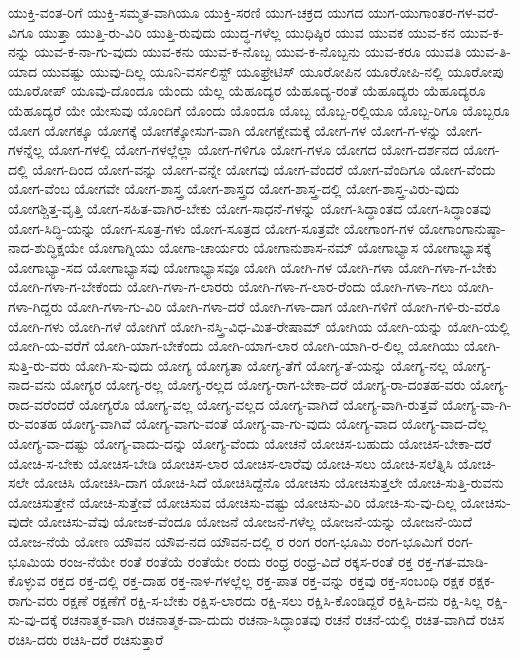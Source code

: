 {ಯುಕ್ತಿ-ವಂತ-ರಿಗೆ
ಯುಕ್ತಿ-ಸಮ್ಮತ-ವಾಗಿಯೂ
ಯುಕ್ತಿ-ಸರಣಿ
ಯುಗ-ಚಕ್ರದ
ಯುಗದ
ಯುಗ-ಯುಗಾಂತರ-ಗಳ-ವರೆ-ವಿಗೂ
ಯುತ್ತಾ
ಯುತ್ತಿ-ರು-ವಿರಿ
ಯುತ್ತಿ-ರುವುದು
ಯುದ್ಧ-ಗಳೆಲ್ಲ
ಯುಧಿಷ್ಠಿರ
ಯುವ
ಯುವಕ
ಯುವ-ಕನ
ಯುವ-ಕ-ನನ್ನು
ಯುವ-ಕ-ನಾ-ಗು-ವುದು
ಯುವ-ಕನು
ಯುವ-ಕ-ನೊಬ್ಬ
ಯುವ-ಕ-ನೊಬ್ಬನು
ಯುವ-ಕರೂ
ಯುವತಿ
ಯುವ-ತಿ-ಯಾದ
ಯುವಷ್ಟು
ಯುವು-ದಿಲ್ಲ
ಯೂನಿ-ವರ್ಸಲಿಸ್ಟ್
ಯೂಫ್ರೇಟಿಸ್
ಯೂರೋಪಿನ
ಯೂರೋಪಿ-ನಲ್ಲಿ
ಯೂರೋಪು
ಯೂರೋಪ್
ಯೂವು-ದೊಂದೂ
ಯೆಂದು
ಯೆಲ್ಲ
ಯೆಹೂದ್ಯರ
ಯೆಹೂದ್ಯ-ರಂತೆ
ಯೆಹೂದ್ಯರು
ಯೆಹೂದ್ಯರೂ
ಯೆಹೂದ್ಯರೆ
ಯೇ
ಯೇಸುವು
ಯೊಂದಿಗೆ
ಯೊಂದು
ಯೊಂದೂ
ಯೊಬ್ಬ
ಯೊಬ್ಬ-ರಲ್ಲಿಯೂ
ಯೊಬ್ಬ-ರಿಗೂ
ಯೊಬ್ಬರೂ
ಯೋಗ
ಯೋಗಕ್ಕೂ
ಯೋಗಕ್ಕೆ
ಯೋಗಕ್ಕೋಸುಗ-ವಾಗಿ
ಯೋಗಕ್ಷೇಮಕ್ಕೆ
ಯೋಗ-ಗಳ
ಯೋಗ-ಗ-ಳನ್ನು
ಯೋಗ-ಗಳನ್ನೆಲ್ಲ
ಯೋಗ-ಗಳಲ್ಲಿ
ಯೋಗ-ಗಳಲ್ಲೆಲ್ಲಾ
ಯೋಗ-ಗಳಿಗೂ
ಯೋಗ-ಗಳೂ
ಯೋಗದ
ಯೋಗ-ದರ್ಶನದ
ಯೋಗ-ದಲ್ಲಿ
ಯೋಗ-ದಿಂದ
ಯೋಗ-ವನ್ನು
ಯೋಗ-ವನ್ನೇ
ಯೋಗವು
ಯೋಗ-ವೆಂದರೆ
ಯೋಗ-ವೆಂದಿಗೂ
ಯೋಗ-ವೆಂದು
ಯೋಗ-ವೆಂಬ
ಯೋಗವೇ
ಯೋಗ-ಶಾಸ್ತ್ರ
ಯೋಗ-ಶಾಸ್ತ್ರದ
ಯೋಗ-ಶಾಸ್ತ್ರ-ದಲ್ಲಿ
ಯೋಗ-ಶಾಸ್ತ್ರ-ವಿರು-ವುದು
ಯೋಗಶ್ಚಿತ್ತ-ವೃತ್ತಿ
ಯೋಗ-ಸಹಿತ-ವಾಗಿರ-ಬೇಕು
ಯೋಗ-ಸಾಧನೆ-ಗಳನ್ನು
ಯೋಗ-ಸಿದ್ಧಾಂತದ
ಯೋಗ-ಸಿದ್ಧಾಂತವು
ಯೋಗ-ಸಿದ್ಧಿ-ಯನ್ನು
ಯೋಗ-ಸೂತ್ರ-ಗಳು
ಯೋಗ-ಸೂತ್ರದ
ಯೋಗ-ಸೂತ್ರವೇ
ಯೋಗಾಂಗ-ಗಳ
ಯೋಗಾಂಗಾನುಷ್ಠಾ-ನಾದ-ಶುದ್ಧಿಕ್ಷಯೇ
ಯೋಗಾಗ್ನಿಯು
ಯೋಗಾ-ಚಾರ್ಯರು
ಯೋಗಾನುಶಾಸ-ನಮ್
ಯೋಗಾಭ್ಯಾಸ
ಯೋಗಾಭ್ಯಾಸಕ್ಕೆ
ಯೋಗಾಭ್ಯಾ-ಸದ
ಯೋಗಾಭ್ಯಾಸವು
ಯೋಗಾಭ್ಯಾಸವೂ
ಯೋಗಿ
ಯೋಗಿ-ಗಳ
ಯೋಗಿ-ಗಳಾ
ಯೋಗಿ-ಗಳಾ-ಗ-ಬೇಕು
ಯೋಗಿ-ಗಳಾ-ಗ-ಬೇಕೆಂದು
ಯೋಗಿ-ಗಳಾ-ಗ-ಲಾರರು
ಯೋಗಿ-ಗಳಾ-ಗ-ಲಾರ-ರೆಂದು
ಯೋಗಿ-ಗಳಾ-ಗಲು
ಯೋಗಿ-ಗಳಾ-ಗಿದ್ದರು
ಯೋಗಿ-ಗಳಾ-ಗು-ವಿರಿ
ಯೋಗಿ-ಗಳಾ-ದರೆ
ಯೋಗಿ-ಗಳಾ-ದಾಗ
ಯೋಗಿ-ಗಳಿಗೆ
ಯೋಗಿ-ಗಳಿ-ರು-ವರೊ
ಯೋಗಿ-ಗಳು
ಯೋಗಿ-ಗಳೆ
ಯೋಗಿಗೆ
ಯೋಗಿ-ನಸ್ತ್ರಿ-ವಿಧ-ಮಿತ-ರೇಷಾಮ್
ಯೋಗಿಯ
ಯೋಗಿ-ಯನ್ನು
ಯೋಗಿ-ಯಲ್ಲಿ
ಯೋಗಿ-ಯ-ವರೆಗೆ
ಯೋಗಿ-ಯಾಗ-ಬೇಕೆಂದು
ಯೋಗಿ-ಯಾಗ-ಲಾರ
ಯೋಗಿ-ಯಾಗಿ-ರ-ಲಿಲ್ಲ
ಯೋಗಿಯು
ಯೋಗಿ-ಸುತ್ತಿ-ರು-ವರು
ಯೋಗಿ-ಸು-ವುದು
ಯೋಗ್ಯ
ಯೋಗ್ಯತಾ
ಯೋಗ್ಯ-ತೆಗೆ
ಯೋಗ್ಯ-ತೆ-ಯನ್ನು
ಯೋಗ್ಯ-ನಲ್ಲ
ಯೋಗ್ಯ-ನಾದ-ವನು
ಯೋಗ್ಯರ
ಯೋಗ್ಯ-ರಲ್ಲ
ಯೋಗ್ಯ-ರಲ್ಲದ
ಯೋಗ್ಯ-ರಾಗ-ಬೇಕಾ-ದರೆ
ಯೋಗ್ಯ-ರಾ-ದಂತಹ-ವರು
ಯೋಗ್ಯ-ರಾದ-ವರೆಂದರೆ
ಯೋಗ್ಯರೊ
ಯೋಗ್ಯ-ವಲ್ಲ
ಯೋಗ್ಯ-ವಲ್ಲದ
ಯೋಗ್ಯ-ವಾಗಿದೆ
ಯೋಗ್ಯ-ವಾಗಿ-ರುತ್ತವೆ
ಯೋಗ್ಯ-ವಾ-ಗಿ-ರು-ವಂತಹ
ಯೋಗ್ಯ-ವಾಗಿವೆ
ಯೋಗ್ಯ-ವಾಗು-ವಂತೆ
ಯೋಗ್ಯ-ವಾ-ಗು-ವುದು
ಯೋಗ್ಯ-ವಾದ
ಯೋಗ್ಯ-ವಾದ-ದೆಲ್ಲ
ಯೋಗ್ಯ-ವಾ-ದಷ್ಟು
ಯೋಗ್ಯ-ವಾದು-ದನ್ನು
ಯೋಗ್ಯ-ವೆಂದು
ಯೋಚನೆ
ಯೋಚಿಸ-ಬಹುದು
ಯೋಚಿಸ-ಬೇಕಾ-ದರೆ
ಯೋಚಿ-ಸ-ಬೇಕು
ಯೋಚಿಸ-ಬೇಡಿ
ಯೋಚಿಸ-ಲಾರ
ಯೋಚಿಸ-ಲಾರೆವು
ಯೋಚಿ-ಸಲು
ಯೋಚಿ-ಸಲೆತ್ನಿಸಿ
ಯೋಚಿ-ಸಲೇ
ಯೋಚಿಸಿ
ಯೋಚಿಸಿ-ದಾಗ
ಯೋಚಿ-ಸಿದೆ
ಯೋಚಿಸಿದ್ದೆನೊ
ಯೋಚಿಸು
ಯೋಚಿಸುತ್ತಲೇ
ಯೋಚಿ-ಸುತ್ತಿ-ರುವನು
ಯೋಚಿಸುತ್ತೇನೆ
ಯೋಚಿ-ಸುತ್ತೇವೆ
ಯೋಚಿಸುವ
ಯೋಚಿಸು-ವಷ್ಟು
ಯೋಚಿಸು-ವಿರಿ
ಯೋಚಿ-ಸು-ವು-ದಿಲ್ಲ
ಯೋಚಿಸು-ವುದೇ
ಯೋಚಿಸು-ವೆವು
ಯೋಜಕ-ವೆಂದೂ
ಯೋಜನೆ
ಯೋಜನೆ-ಗಳೆಲ್ಲ
ಯೋಜನೆ-ಯನ್ನು
ಯೋಜನೆ-ಯಿದೆ
ಯೋಜ-ನೆಯೆ
ಯೋಣ
ಯೌವನ
ಯೌವ-ನದ
ಯೌವನ-ದಲ್ಲಿ
ರ
ರಂಗ
ರಂಗ-ಭೂಮಿ
ರಂಗ-ಭೂಮಿಗೆ
ರಂಗ-ಭೂಮಿಯ
ರಂಜ-ನೆಯೇ
ರಂತೆ
ರಂತೆಯೆ
ರಂತೆಯೇ
ರಂದು
ರಂಧ್ರ
ರಂಧ್ರ-ವಿದೆ
ರಕ್ಕಸ-ರಂತೆ
ರಕ್ತ
ರಕ್ತ-ಗತ-ಮಾಡಿ-ಕೊಳ್ಳುವ
ರಕ್ತದ
ರಕ್ತ-ದಲ್ಲಿ
ರಕ್ತ-ದಾಹ
ರಕ್ತ-ನಾಳ-ಗಳಲ್ಲೆಲ್ಲ
ರಕ್ತ-ಪಾತ
ರಕ್ತ-ವನ್ನು
ರಕ್ತವು
ರಕ್ತ-ಸಂಬಂಧಿ
ರಕ್ಷಕ
ರಕ್ಷಕ-ರಾಗು-ವರು
ರಕ್ಷಣೆ
ರಕ್ಷಣೆಗೆ
ರಕ್ಷಿ-ಸ-ಬೇಕು
ರಕ್ಷಿಸ-ಲಾರದು
ರಕ್ಷಿ-ಸಲು
ರಕ್ಷಿಸಿ-ಕೊಂಡಿದ್ದರೆ
ರಕ್ಷಿಸಿ-ದನು
ರಕ್ಷಿ-ಸಿಲ್ಲ
ರಕ್ಷಿ-ಸು-ವು-ದಕ್ಕೆ
ರಚನಾತ್ಮಕ-ವಾಗಿ
ರಚನಾತ್ಮಕ-ವಾ-ದುದು
ರಚನಾ-ಸಿದ್ಧಾಂತವು
ರಚನೆ
ರಚನೆ-ಯಲ್ಲಿ
ರಚಿತ-ವಾಗಿದೆ
ರಚಿಸ
ರಚಿಸಿ-ದರು
ರಚಿಸಿ-ದರೆ
ರಚಿಸುತ್ತಾರೆ
}
